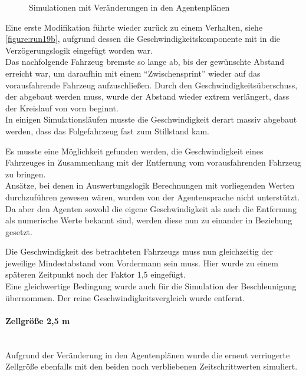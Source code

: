 \begin{figure}[hptb]
  \centering 
   \qquad 
   \qquad 
  \caption{Simulationen mit Veränderungen in den Agentenplänen} 
  \label{figure:run19a-c}
\end{figure}

Eine erste Modifikation führte wieder zurück zu einem Verhalten, siehe \cref{figure:run19b}, aufgrund dessen die Geschwindigkeitskomponente mit in die Verzögerungslogik eingefügt worden war. 
\\
Das nachfolgende Fahrzeug bremste so lange ab, bis der gewünschte Abstand erreicht war, um daraufhin mit einem \enquote{Zwischensprint} wieder auf das vorausfahrende Fahrzeug aufzuschließen.
Durch den Geschwindigkeitsüberschuss, der abgebaut werden muss, wurde der Abstand wieder extrem verlängert, dass der Kreislauf von vorn beginnt.
\\
In einigen Simulationsläufen musste die Geschwindigkeit derart massiv abgebaut werden, dass das Folgefahrzeug fast zum Stillstand kam.

Es musste eine Möglichkeit gefunden werden, die Geschwindigkeit eines Fahrzeuges in Zusammenhang mit der Entfernung vom vorausfahrenden Fahrzeug zu bringen.
\\
Ansätze, bei denen in Auswertungslogik Berechnungen mit vorliegenden Werten durchzuführen gewesen wären, wurden von der Agentensprache nicht unterstützt.
\\
Da aber den Agenten sowohl die eigene Geschwindigkeit als auch die Entfernung als numerische Werte bekannt sind, werden diese nun zu einander in Beziehung gesetzt.

Die Geschwindigkeit des betrachteten Fahrzeugs muss nun gleichzeitig der jeweilige Mindestabstand vom Vordermann sein muss. 
Hier wurde zu einem späteren Zeitpunkt noch der Faktor 1,5 eingefügt.
\\
Eine gleichwertige Bedingung wurde auch für die Simulation der Beschleunigung übernommen.
Der reine Geschwindigkeitsvergleich wurde entfernt.


\paragraph*{Zellgröße 2,5 m}
\hfill \\
Aufgrund der Veränderung in den Agentenplänen wurde die erneut verringerte Zellgröße ebenfalls mit den beiden noch verbliebenen Zeitschrittwerten simuliert.


